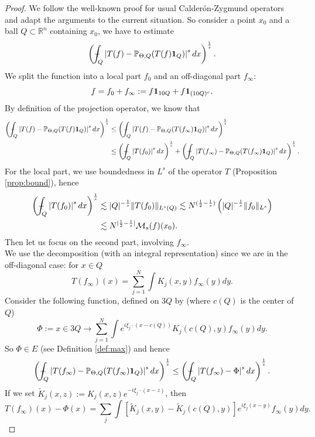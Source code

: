 \documentclass[11pt]{amsart}
\theoremstyle{remark}
\newcommand{\rn}{\mathbb{R}^n}
\newcommand{\pr}{{\mathbb P}}
\def\Xint#1{\mathchoice
   {\XXint\displaystyle\textstyle{#1}}%
   {\XXint\textstyle\scriptstyle{#1}}%
   {\XXint\scriptstyle\scriptscriptstyle{#1}}%
   {\XXint\scriptscriptstyle\scriptscriptstyle{#1}}%
   \!\int}
\def\XXint#1#2#3{{\setbox0=\hbox{$#1{#2#3}{\int}$}
     \vcenter{\hbox{$#2#3$}}\kern-.5\wd0}}
\def\aver#1{\Xint-_{#1}}
\begin{document}
\begin{proof} We follow the well-known proof for usual Calder\'on-Zygmund operators and adapt the arguments to the current situation. So consider a point $x_0$ and a ball $Q\subset \rn$ containing $x_0$, we have to estimate
$$ \left( \aver{Q} \left|T(f)-\pr_{\Theta,Q}(T(f){\bf 1}_Q) \right|^s dx \right)^{\frac{1}{s}}.$$
We split the function into a local part $f_0$ and an off-diagonal part $f_\infty$: 
$$f=f_0+f_\infty:= f{\bf 1}_{10 Q} + f {\bf 1}_{(10 Q)^c}.$$ 
By definition of the projection operator, we know that
\begin{align*}
 \left( \aver{Q} \left|T(f)-\pr_{\Theta,Q}(T(f){\bf 1}_Q) \right|^s dx \right)^{\frac{1}{s}} & \leq \left( \aver{Q} \left|T(f)-\pr_{\Theta,Q}(T(f_\infty){\bf 1}_Q) \right|^s dx \right)^{\frac{1}{s}} \\
 & \leq \left( \aver{Q} \left|T(f_0) \right|^s dx \right)^{\frac{1}{s}} + \left( \aver{Q} \left|T(f_\infty)-\pr_{\Theta,Q}(T(f_\infty){\bf 1}_Q) \right|^s dx \right)^{\frac{1}{s}}.
\end{align*}
For the local part, we use boundedness in $L^s$ of the operator $T$ (Proposition \ref{prop:bound}), hence
\begin{align*}
 \left( \aver{Q} \left|T(f_0)\right|^s dx \right)^{\frac{1}{s}} & \lesssim |Q|^{-\frac{1}{s}} \|T(f_0)\|_{L^s(Q)} \lesssim  N^{(\frac{1}{2}-\frac{1}{s})} \left(|Q|^{-\frac{1}{s}} \|f_0\|_{L^s}\right) \\
& \lesssim N^{|\frac{1}{2}-\frac{1}{s}|} {\mathcal M}_s(f)(x_0).
\end{align*}
Then let us focus on the second part, involving $f_\infty$. \\
We use the decomposition (with an integral representation) since we are in the off-diagonal case: for $x\in Q$ 
$$ T(f_\infty)(x) = \sum_{j=1}^N  \int K_j(x,y) f_\infty(y) dy.$$
Consider the following function, defined on $3Q$ by (where $c(Q)$ is the center of $Q$)
$$ \Phi:=  x\in 3Q \rightarrow \sum_{j=1}^N  \int  e^{i\xi_j\cdot (x-c(Q))} K_j(c(Q),y) f_\infty(y) dy.$$
So $\Phi \in E$ (see Definition \ref{def:max}) and hence 
\begin{equation} \left( \aver{Q} \left|T(f_\infty)-\pr_{\Theta,Q}(T(f_\infty){\bf 1}_Q) \right|^s dx \right)^{\frac{1}{s}} \leq \left( \aver{Q} \left|T(f_\infty)-\Phi \right|^s dx \right)^{\frac{1}{s}}. \label{eq::} \end{equation}
If we set $\widetilde{K}_j(x,z):=K_j(x,z)e^{-i\xi_j\cdot (x-z)}$, then 
$$ T(f_\infty)(x) -\Phi(x) =  \sum_j \int \left[\widetilde{K}_{j}(x,y) - \widetilde{K}_j(c(Q),y)\right] e^{i\xi_j(x-y)} f_\infty(y) dy.$$

\end{proof}
\end{document}
